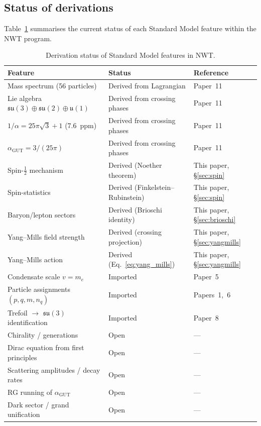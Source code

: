 \documentclass[11pt]{article}
\newcommand{\su}{\mathfrak{su}}
\newcommand{\uu}{\mathfrak{u}}
\newcommand{\half}{\tfrac{1}{2}}
\begin{document}
\subsection{Status of derivations}

Table~\ref{tab:status} summarises the current status of each
Standard Model feature within the NWT program.

\begin{table}[t]
\centering
\caption{Derivation status of Standard Model features in NWT.}
\label{tab:status}
\smallskip
\small
\begin{tabular}{lll}
\toprule
\textbf{Feature} & \textbf{Status} & \textbf{Reference} \\
\midrule
Mass spectrum (56 particles) & Derived from Lagrangian &
    Paper~11 \\
Lie algebra $\su(3)\oplus\su(2)\oplus\uu(1)$ &
    Derived from crossing phases & Paper~11 \\
$1/\alpha = 25\pi\sqrt{3}+1$ (7.6~ppm) &
    Derived from crossing phases & Paper~11 \\
$\alpha_\text{GUT} = 3/(25\pi)$ &
    Derived from crossing phases & Paper~11 \\
Spin-$\half$ mechanism & Derived (Noether theorem) &
    This paper, \S\ref{sec:spin} \\
Spin-statistics & Derived (Finkelstein--Rubinstein) &
    This paper, \S\ref{sec:spin} \\
Baryon/lepton sectors & Derived (Brioschi identity) &
    This paper, \S\ref{sec:brioschi} \\
Yang--Mills field strength & Derived (crossing projection) &
    This paper, \S\ref{sec:yangmills} \\
Yang--Mills action & Derived (Eq.~\ref{eq:yang_mills}) &
    This paper, \S\ref{sec:yangmills} \\
\midrule
Condensate scale $v = m_e$ & Imported & Paper~5 \\
Particle assignments $(p,q,m,n_q)$ & Imported &
    Papers~1,~6 \\
Trefoil $\to$ $\su(3)$ identification & Imported &
    Paper~8 \\
\midrule
Chirality / generations & Open & --- \\
Dirac equation from first principles & Open & --- \\
Scattering amplitudes / decay rates & Open & --- \\
RG running of $\alpha_\text{GUT}$ & Open & --- \\
Dark sector / grand unification & Open & --- \\
\bottomrule
\end{tabular}
\end{table}
\end{document}
